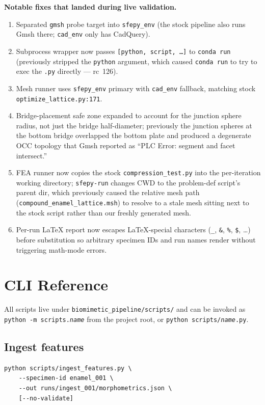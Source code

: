 \documentclass[11pt, letterpaper]{article}
\begin{document}
\begin{mechanismbox}
\textbf{Notable fixes that landed during live validation.}
\begin{enumerate}
  \item Separated \texttt{gmsh} probe target into \texttt{sfepy\_env} (the stock pipeline also runs Gmsh there; \texttt{cad\_env} only has CadQuery).
  \item Subprocess wrapper now passes \texttt{[python, script, \ldots]} to \texttt{conda run} (previously stripped the \texttt{python} argument, which caused \texttt{conda run} to try to exec the \texttt{.py} directly --- rc~126).
  \item Mesh runner uses \texttt{sfepy\_env} primary with \texttt{cad\_env} fallback, matching stock \texttt{optimize\_lattice.py:171}.
  \item Bridge-placement safe zone expanded to account for the junction sphere radius, not just the bridge half-diameter; previously the junction spheres at the bottom bridge overlapped the bottom plate and produced a degenerate OCC topology that Gmsh reported as ``PLC Error: segment and facet intersect.''
  \item FEA runner now copies the stock \texttt{compression\_test.py} into the per-iteration working directory; \texttt{sfepy-run} changes CWD to the problem-def script's parent dir, which previously caused the relative mesh path (\texttt{compound\_enamel\_lattice.msh}) to resolve to a stale mesh sitting next to the stock script rather than our freshly generated mesh.
  \item Per-run LaTeX report now escapes LaTeX-special characters (\texttt{\_}, \texttt{\&}, \texttt{\%}, \texttt{\$}, \ldots) before substitution so arbitrary specimen IDs and run names render without triggering math-mode errors.
\end{enumerate}
\end{mechanismbox}

\section{CLI Reference}

All scripts live under \texttt{biomimetic\_pipeline/scripts/} and can be invoked as \texttt{python -m scripts.\textit{name}} from the project root, or \texttt{python scripts/\textit{name}.py}.

\subsection{Ingest features}
\begin{lstlisting}
python scripts/ingest_features.py \
    --specimen-id enamel_001 \
    --out runs/ingest_001/morphometrics.json \
    [--no-validate]
\end{lstlisting}
\end{document}
